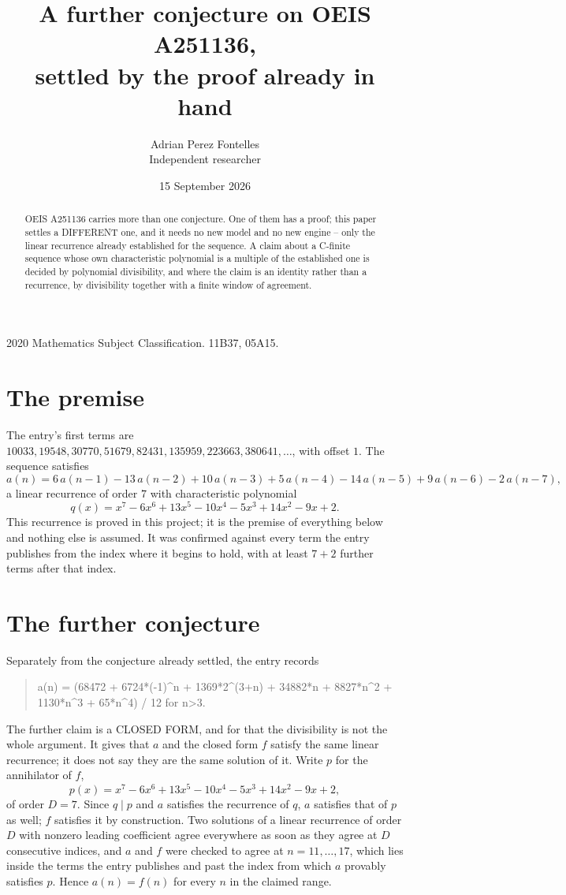 \documentclass[11pt,a4paper]{article}
\title{A further conjecture on OEIS A251136,\\ \large settled by the proof already in hand}
\author{Adrian Perez Fontelles\\ \small Independent researcher}
\date{15 September 2026}
\theoremstyle{plain}
\theoremstyle{definition}
\begin{document}
\maketitle

\begin{abstract}
OEIS A251136 carries more than one conjecture. One of them has a proof; this paper settles a
DIFFERENT one, and it needs no new model and no new engine -- only the linear recurrence already
established for the sequence. A claim about a C-finite sequence whose own characteristic
polynomial is a multiple of the established one is decided by polynomial divisibility, and where
the claim is an identity rather than a recurrence, by divisibility together with a finite window
of agreement.
\end{abstract}

\noindent\small 2020 Mathematics Subject Classification. 11B37, 05A15.\normalsize

\section{The premise}

The entry's first terms are $10033, 19548, 30770, 51679, 82431, 135959, 223663, 380641,\dots$, with offset $1$. The sequence satisfies
\[
  a(n)=6\,a(n-1) - 13\,a(n-2) + 10\,a(n-3) + 5\,a(n-4) - 14\,a(n-5) + 9\,a(n-6) - 2\,a(n-7) ,
\]
a linear recurrence of order $7$ with characteristic polynomial
\[
  q(x)=x^{7} - 6 x^{6} + 13 x^{5} - 10 x^{4} - 5 x^{3} + 14 x^{2} - 9 x + 2 .
\]
This recurrence is proved in this project; it is the premise of everything below and nothing else is assumed.
It was confirmed against every term the entry publishes from the index where it begins to hold,
with at least $7+2$ further terms after that index.

\section{The further conjecture}

Separately from the conjecture already settled, the entry records

\begin{quote}\raggedright a(n) = (68472 + 6724*(-1)\^{}n + 1369*2\^{}(3+n) + 34882*n + 8827*n\^{}2 + 1130*n\^{}3 + 65*n\^{}4) / 12 for n>3.\end{quote}

The further claim is a CLOSED FORM, and for that the divisibility is not the whole argument. It
gives that $a$ and the closed form $f$ satisfy the same linear recurrence; it does not say they
are the same solution of it. Write $p$ for the annihilator of $f$,
\[
  p(x)=x^{7} - 6 x^{6} + 13 x^{5} - 10 x^{4} - 5 x^{3} + 14 x^{2} - 9 x + 2 ,
\]
of order $D=7$. Since $q\mid p$ and $a$ satisfies the recurrence of $q$, $a$ satisfies that of
$p$ as well; $f$ satisfies it by construction. Two solutions of a linear recurrence of order $D$
with nonzero leading coefficient agree everywhere as soon as they agree at $D$ consecutive
indices, and $a$ and $f$ were checked to agree at $n=11,\dots,17$,
which lies inside the terms the entry publishes and past the index from which $a$ provably
satisfies $p$. Hence $a(n)=f(n)$ for every $n$ in the claimed range.
\end{document}
